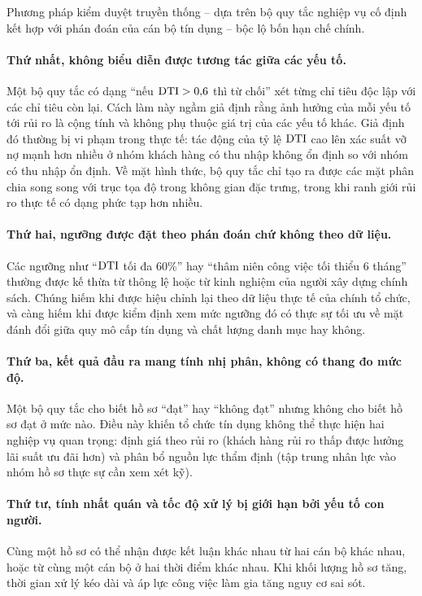 Phương pháp kiểm duyệt truyền thống -- dựa trên bộ quy tắc nghiệp vụ cố định kết
hợp với phán đoán của cán bộ tín dụng -- bộc lộ bốn hạn chế chính.

\paragraph{Thứ nhất, không biểu diễn được tương tác giữa các yếu tố.} Một bộ quy
tắc có dạng ``nếu $\mathrm{DTI} > 0{,}6$ thì từ chối'' xét từng chỉ tiêu độc lập với các
chỉ tiêu còn lại. Cách làm này ngầm giả định rằng ảnh hưởng của mỗi yếu tố tới
rủi ro là cộng tính và không phụ thuộc giá trị của các yếu tố khác. Giả định đó
thường bị vi phạm trong thực tế: tác động của tỷ lệ $\mathrm{DTI}$ cao lên xác suất vỡ nợ
mạnh hơn nhiều ở nhóm khách hàng có thu nhập không ổn định so với nhóm có thu
nhập ổn định. Về mặt hình thức, bộ quy tắc chỉ tạo ra được các mặt phân chia song
song với trục tọa độ trong không gian đặc trưng, trong khi ranh giới rủi ro thực
tế có dạng phức tạp hơn nhiều.

\paragraph{Thứ hai, ngưỡng được đặt theo phán đoán chứ không theo dữ liệu.} Các
ngưỡng như ``$\mathrm{DTI}$ tối đa 60\%'' hay ``thâm niên công việc tối thiểu 6 tháng''
thường được kế thừa từ thông lệ hoặc từ kinh nghiệm của người xây dựng chính
sách. Chúng hiếm khi được hiệu chỉnh lại theo dữ liệu thực tế của chính tổ chức,
và càng hiếm khi được kiểm định xem mức ngưỡng đó có thực sự tối ưu về mặt đánh
đổi giữa quy mô cấp tín dụng và chất lượng danh mục hay không.

\paragraph{Thứ ba, kết quả đầu ra mang tính nhị phân, không có thang đo mức độ.}
Một bộ quy tắc cho biết hồ sơ ``đạt'' hay ``không đạt'' nhưng không cho biết hồ
sơ đạt ở mức nào. Điều này khiến tổ chức tín dụng không thể thực hiện hai nghiệp
vụ quan trọng: định giá theo rủi ro (khách hàng rủi ro thấp được hưởng lãi suất
ưu đãi hơn) và phân bổ nguồn lực thẩm định (tập trung nhân lực vào nhóm hồ sơ
thực sự cần xem xét kỹ).

\paragraph{Thứ tư, tính nhất quán và tốc độ xử lý bị giới hạn bởi yếu tố con
người.} Cùng một hồ sơ có thể nhận được kết luận khác nhau từ hai cán bộ khác
nhau, hoặc từ cùng một cán bộ ở hai thời điểm khác nhau. Khi khối lượng hồ sơ
tăng, thời gian xử lý kéo dài và áp lực công việc làm gia tăng nguy cơ sai sót.

